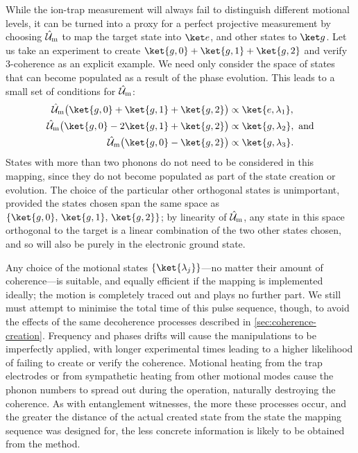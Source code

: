 While the ion-trap measurement will always fail to distinguish different motional levels, it can be turned into a proxy for a perfect projective measurement by choosing $\hat{\mathcal U}_{\text m}$ to map the target state into $\ket e$, and other states to $\ket g$.
Let us take an experiment to create $\ket{g,0} + \ket{g,1} + \ket{g,2}$ and verify 3-coherence as an explicit example.
We need only consider the space of states that can become populated as a result of the phase evolution.
This leads to a small set of conditions for $\hat{\mathcal U}_{\text m}$:
\begin{equation}\label{eq:coherence-measurement-mapping}\begin{aligned}
\hat{\mathcal U}_{\text m} \bigl(\ket{g,0} + \ket{g,1} + \ket{g,2}\bigr) &\propto \ket{e,\lambda_1},\\
\hat{\mathcal U}_{\text m} \bigl(\ket{g,0} - 2\ket{g,1} + \ket{g,2}\bigr) &\propto \ket{g,\lambda_2},\text{ and}\\
\hat{\mathcal U}_{\text m} \bigl(\ket{g,0} - \ket{g,2}\bigr) &\propto \ket{g,\lambda_3}.
\end{aligned}\end{equation}
States with more than two phonons do not need to be considered in this mapping, since they do not become populated as part of the state creation or evolution.
The choice of the particular other orthogonal states is unimportant, provided the states chosen span the same space as $\{\ket{g,0},\,\ket{g,1},\,\ket{g,2}\}$; by linearity of $\hat{\mathcal U}_{\text m}$, any state in this space orthogonal to the target is a linear combination of the two other states chosen, and so will also be purely in the electronic ground state.

Any choice of the motional states $\{\ket{\lambda_j}\}$---no matter their amount of coherence---is suitable, and equally efficient if the mapping is implemented ideally; the motion is completely traced out and plays no further part.
We still must attempt to minimise the total time of this pulse sequence, though, to avoid the effects of the same decoherence processes described in \cref{sec:coherence-creation}.
Frequency and phases drifts will cause the manipulations to be imperfectly applied, with longer experimental times leading to a higher likelihood of failing to create or verify the coherence.
Motional heating from the trap electrodes or from sympathetic heating from other motional modes cause the phonon numbers to spread out during the operation, naturally destroying the coherence.
As with entanglement witnesses, the more these processes occur, and the greater the distance of the actual created state from the state the mapping sequence was designed for, the less concrete information is likely to be obtained from the method.


